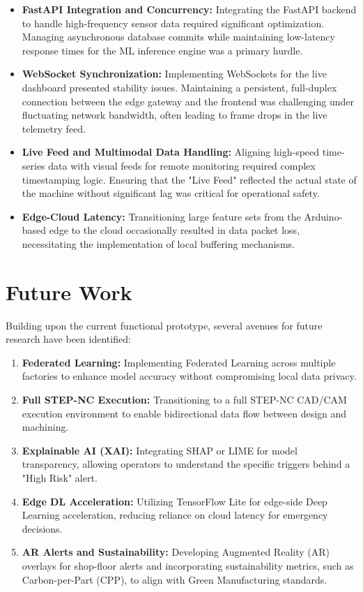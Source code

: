 \begin{itemize}
    \item \textbf{FastAPI Integration and Concurrency:} Integrating the FastAPI backend to handle high-frequency sensor data required significant optimization. Managing asynchronous database commits while maintaining low-latency response times for the ML inference engine was a primary hurdle.
    \item \textbf{WebSocket Synchronization:} Implementing WebSockets for the live dashboard presented stability issues. Maintaining a persistent, full-duplex connection between the edge gateway and the frontend was challenging under fluctuating network bandwidth, often leading to frame drops in the live telemetry feed.
    \item \textbf{Live Feed and Multimodal Data Handling:} Aligning high-speed time-series data with visual feeds for remote monitoring required complex timestamping logic. Ensuring that the "Live Feed" reflected the actual state of the machine without significant lag was critical for operational safety.
    \item \textbf{Edge-Cloud Latency:} Transitioning large feature sets from the Arduino-based edge to the cloud occasionally resulted in data packet loss, necessitating the implementation of local buffering mechanisms.
\end{itemize}

\section{Future Work}
Building upon the current functional prototype, several avenues for future research have been identified:

\begin{enumerate}
    \item \textbf{Federated Learning:} Implementing Federated Learning across multiple factories to enhance model accuracy without compromising local data privacy.
    \item \textbf{Full STEP-NC Execution:} Transitioning to a full STEP-NC CAD/CAM execution environment to enable bidirectional data flow between design and machining.
    \item \textbf{Explainable AI (XAI):} Integrating SHAP or LIME for model transparency, allowing operators to understand the specific triggers behind a "High Risk" alert.
    \item \textbf{Edge DL Acceleration:} Utilizing TensorFlow Lite for edge-side Deep Learning acceleration, reducing reliance on cloud latency for emergency decisions.
    \item \textbf{AR Alerts and Sustainability:} Developing Augmented Reality (AR) overlays for shop-floor alerts and incorporating sustainability metrics, such as Carbon-per-Part (CPP), to align with Green Manufacturing standards.
\end{enumerate}